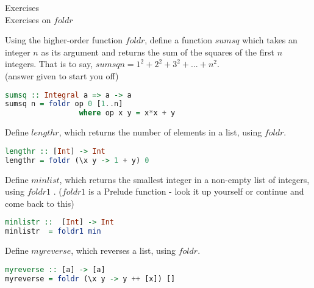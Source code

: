 \documentclass{article}
\newcommand\ExTitle{Exercises on $foldr$}
\newcommand\fullExTitle{Exercises \\ \ExTitle }
\begin{document}
\begin{Huge}
	\begin{center}
	\fullExTitle
	\end{center}
\end{Huge}

\begin{Exercise} 
Using the higher-order function $foldr$,  define a function $sumsq$ which takes an
integer $n$ as its argument and returns the sum of the squares of the first $n$
integers. That is to say,
$sumsq n = 1^{2} + 2^{2} + 3^{2} + . . . + n^{2} $. \\
(answer given to start you off)
\begin{lstlisting}[language=Haskell]
sumsq :: Integral a => a -> a
sumsq n = foldr op 0 [1..n]
                 where op x y = x*x + y
\end{lstlisting}
\end{Exercise}
\begin{Exercise} 
Define $lengthr$, which returns the number of elements in a list, using $foldr$. 
\end{Exercise}
\begin{Answer}
\begin{lstlisting}[language=Haskell]
lengthr :: [Int] -> Int
lengthr = foldr (\x y -> 1 + y) 0
\end{lstlisting}

\end{Answer}

\begin{Exercise}  [difficulty=6]
Define $minlist$, which returns the smallest integer in a non-empty list of integers,
using $foldr1$ . ($foldr1$ is a Prelude function - look it up yourself or continue and come back to this)
\end{Exercise} 
\begin{Answer}
\begin{lstlisting}[language=Haskell]
minlistr ::  [Int] -> Int
minlistr  = foldr1 min\end{lstlisting}
\end{Answer}


\begin{Exercise} [difficulty=4]
Define $myreverse$, which reverses a list, using $foldr$.
\end{Exercise} 
\begin{Answer}
\begin{lstlisting}[language=Haskell]
myreverse :: [a] -> [a]
myreverse = foldr (\x y -> y ++ [x]) []
\end{lstlisting}
\end{Answer}
\end{document}
